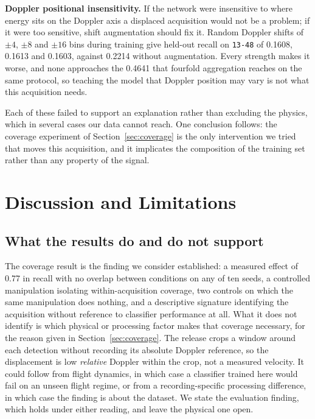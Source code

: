 \documentclass[11pt,a4paper]{article}
\newcommand{\s}[1]{\texttt{#1}}            %
\newcommand{\tgt}{\s{13-48}}               %
\begin{document}
\textbf{Doppler positional insensitivity.} If the network were insensitive
to where energy sits on the Doppler axis a displaced acquisition would not
be a problem; if it were too sensitive, shift augmentation should fix it.
Random Doppler shifts of $\pm 4$, $\pm 8$ and $\pm 16$ bins during training
give held-out recall on \tgt{} of 0.1608, 0.1613 and 0.1603, against 0.2214
without augmentation. Every strength makes it worse, and none approaches
the 0.4641 that fourfold aggregation reaches on the same protocol, so
teaching the model that Doppler position may vary is not what this
acquisition needs.

Each of these failed to support an explanation rather than excluding the
physics, which in several cases our data cannot reach. One conclusion
follows: the coverage experiment of Section~\ref{sec:coverage} is the only
intervention we tried that moves this acquisition, and it implicates the
composition of the training set rather than any property of the signal.

\section{Discussion and Limitations}
\label{sec:discussion}

\subsection{What the results do and do not support}

The coverage result is the finding we consider established: a measured effect of 0.77 in recall with no overlap between conditions on any of ten seeds, a controlled manipulation isolating within-acquisition coverage, two controls on which the same manipulation does nothing, and a descriptive signature identifying the acquisition without reference to classifier performance at all. What it does not identify is which physical or processing factor makes that coverage necessary, for the reason given in Section~\ref{sec:coverage}. The release crops a window around each detection without recording its absolute Doppler reference, so the displacement is low \emph{relative} Doppler within the crop, not a measured velocity. It could follow from flight dynamics, in which case a classifier trained here would fail on an unseen flight regime, or from a recording-specific processing difference, in which case the finding is about the dataset. We state the evaluation finding, which holds under either reading, and leave the physical one open.
\end{document}
